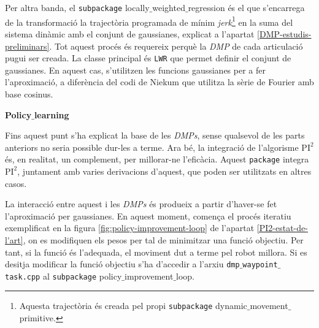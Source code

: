 \documentclass[12pt,a4paper,final,twoside]{article}
\begin{document}

Per altra banda, el \texttt{subpackage} locally$\_$weighted$\_$regression és el que s'encarrega de la transformació la trajectòria programada de mínim \textit{jerk}\footnote{Aquesta trajectòria és creada pel propi \texttt{subpackage} dynamic$\_$movement$\_$primitive.} en la suma del sistema dinàmic amb el conjunt de gaussianes, explicat a l'apartat \ref{DMP-estudis-preliminars}. Tot aquest procés és requereix perquè la \textit{DMP} de cada articulació pugui ser creada. La classe principal és \texttt{LWR} que permet definir el conjunt de gaussianes. En aquest cas, s'utilitzen les funcions gaussianes per a fer l'aproximació, a diferència del codi de Niekum que utilitza la sèrie de Fourier amb base cosinus. 

\vspace{20pt}
\textbf{Policy$\_$learning}

Fins aquest punt s'ha explicat la base de les \textit{DMPs}, sense qualsevol de les parts anteriors no seria possible dur-les a terme. Ara bé, la integració de l'algorisme $\mathrm{PI^2}$ és, en realitat, un complement, per millorar-ne l'eficàcia. Aquest \texttt{package} integra $\mathrm{PI^2}$, juntament amb varies derivacions d'aquest, que poden ser utilitzats en altres casos.

La interacció entre aquest i les \textit{DMPs} és produeix a partir d'haver-se fet l'aproximació per gaussianes. En aquest moment, comença el procés iteratiu exemplificat en la figura \ref{fig:policy-improvement-loop} de l'apartat \ref{PI2-estat-de-l'art}, on es modifiquen els pesos per tal de minimitzar una funció objectiu. Per tant, si la funció és l'adequada, el moviment dut a terme pel robot millora. Si es desitja modificar la funció objectiu s'ha d'accedir a l'arxiu \texttt{dmp$\_$waypoint$\_$task.cpp} al \texttt{subpackage} policy$\_$improvement$\_$loop.



\end{document}
